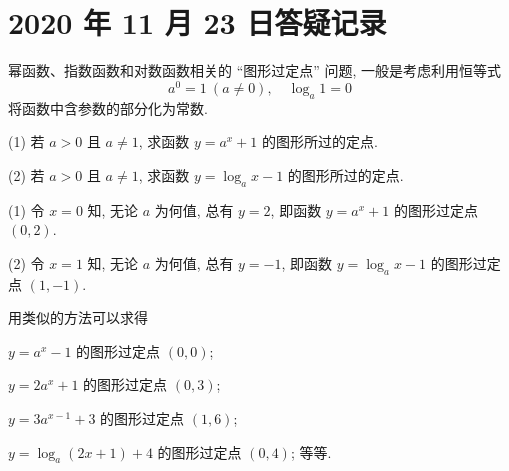 \section{2020 年 11 月 23 日答疑记录}

幂函数、指数函数和对数函数相关的 ``图形过定点'' 问题, 一般是考虑利用恒等式
\[a^0=1\ (a\neq0),\quad \log_a 1=0\]
将函数中含参数的部分化为常数.

\begin{example}
    (1) 若 $a>0$ 且 $a\neq 1$, 求函数 $y=a^x+1$ 的图形所过的定点.
    
    (2) 若 $a>0$ 且 $a\neq 1$, 求函数 $y=\log_a x-1$ 的图形所过的定点.
\end{example}
\begin{solution}
    (1) 令 $x=0$ 知, 无论 $a$ 为何值, 总有 $y=2$, 即函数 $y=a^x+1$ 的图形过定点 $(0,2)$.
    
    (2) 令 $x=1$ 知, 无论 $a$ 为何值, 总有 $y=-1$, 即函数 $y=\log_a x-1$ 的图形过定点 $(1,-1)$.
\end{solution}

用类似的方法可以求得

$y=a^x-1$ 的图形过定点 $(0,0)$;

$y=2a^x+1$ 的图形过定点 $(0,3)$; 

$y=3a^{x-1}+3$ 的图形过定点 $(1,6)$; 

$y=\log_a (2x+1)+4$ 的图形过定点 $(0,4)$; 等等.

